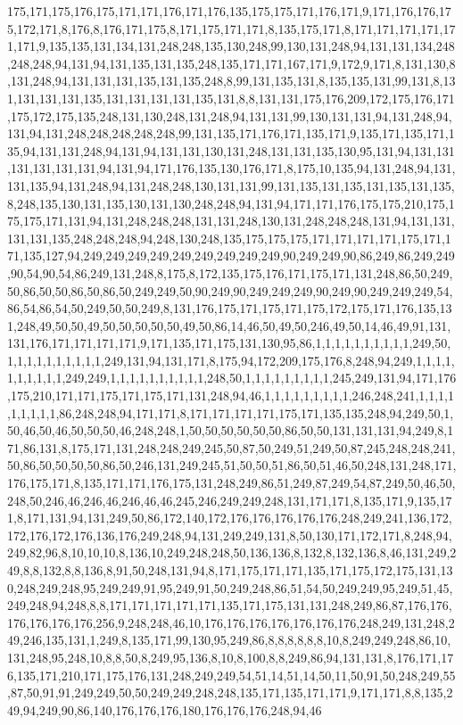 175,171,175,176,175,171,171,176,171,176,135,175,175,171,176,171,9,171,176,176,175,172,171,8,176,8,176,171,175,8,171,175,171,171,8,135,175,171,8,171,171,171,171,171,171,9,135,135,131,134,131,248,248,135,130,248,99,130,131,248,94,131,131,134,248,248,248,94,131,94,131,135,131,135,248,135,171,171,167,171,9,172,9,171,8,131,130,8,131,248,94,131,131,131,135,131,135,248,8,99,131,135,131,8,135,135,131,99,131,8,131,131,131,131,135,131,131,131,131,135,131,8,8,131,131,175,176,209,172,175,176,171,175,172,175,135,248,131,130,248,131,248,94,131,131,99,130,131,131,94,131,248,94,131,94,131,248,248,248,248,248,99,131,135,171,176,171,135,171,9,135,171,135,171,135,94,131,131,248,94,131,94,131,131,130,131,248,131,131,135,130,95,131,94,131,131,131,131,131,131,94,131,94,171,176,135,130,176,171,8,175,10,135,94,131,248,94,131,131,135,94,131,248,94,131,248,248,130,131,131,99,131,135,131,135,131,135,131,135,8,248,135,130,131,135,130,131,130,248,248,94,131,94,171,171,176,175,175,210,175,175,175,171,131,94,131,248,248,248,131,131,248,130,131,248,248,248,131,94,131,131,131,131,135,248,248,248,94,248,130,248,135,175,175,175,171,171,171,171,175,171,171,135,127,94,249,249,249,249,249,249,249,249,249,90,249,249,90,86,249,86,249,249,90,54,90,54,86,249,131,248,8,175,8,172,135,175,176,171,175,171,131,248,86,50,249,50,86,50,50,86,50,86,50,249,249,50,90,249,90,249,249,249,90,249,90,249,249,249,54,86,54,86,54,50,249,50,50,249,8,131,176,175,171,175,171,175,172,175,171,176,135,131,248,49,50,50,49,50,50,50,50,50,49,50,86,14,46,50,49,50,246,49,50,14,46,49,91,131,131,176,171,171,171,171,9,171,135,171,175,131,130,95,86,1,1,1,1,1,1,1,1,1,1,249,50,1,1,1,1,1,1,1,1,1,1,249,131,94,131,171,8,175,94,172,209,175,176,8,248,94,249,1,1,1,1,1,1,1,1,1,1,249,249,1,1,1,1,1,1,1,1,1,1,248,50,1,1,1,1,1,1,1,1,1,245,249,131,94,171,176,175,210,171,171,175,171,175,171,131,248,94,46,1,1,1,1,1,1,1,1,1,246,248,241,1,1,1,1,1,1,1,1,1,86,248,248,94,171,171,8,171,171,171,171,175,171,135,135,248,94,249,50,1,50,46,50,46,50,50,50,46,248,248,1,50,50,50,50,50,50,86,50,50,131,131,131,94,249,8,171,86,131,8,175,171,131,248,248,249,245,50,87,50,249,51,249,50,87,245,248,248,241,50,86,50,50,50,50,86,50,246,131,249,245,51,50,50,51,86,50,51,46,50,248,131,248,171,176,175,171,8,135,171,171,176,175,131,248,249,86,51,249,87,249,54,87,249,50,46,50,248,50,246,46,246,46,246,46,46,245,246,249,249,248,131,171,171,8,135,171,9,135,171,8,171,131,94,131,249,50,86,172,140,172,176,176,176,176,176,248,249,241,136,172,172,176,172,176,136,176,249,248,94,131,249,249,131,8,50,130,171,172,171,8,248,94,249,82,96,8,10,10,10,8,136,10,249,248,248,50,136,136,8,132,8,132,136,8,46,131,249,249,8,8,132,8,8,136,8,91,50,248,131,94,8,171,175,171,171,135,171,175,172,175,131,130,248,249,248,95,249,249,91,95,249,91,50,249,248,86,51,54,50,249,249,95,249,51,45,249,248,94,248,8,8,171,171,171,171,171,135,171,175,131,131,248,249,86,87,176,176,176,176,176,176,256,9,248,248,46,10,176,176,176,176,176,176,176,248,249,131,248,249,246,135,131,1,249,8,135,171,99,130,95,249,86,8,8,8,8,8,8,10,8,249,249,248,86,10,131,248,95,248,10,8,8,50,8,249,95,136,8,10,8,100,8,8,249,86,94,131,131,8,176,171,176,135,171,210,171,175,176,131,248,249,249,54,51,14,51,14,50,11,50,91,50,248,249,55,87,50,91,91,249,249,50,50,249,249,248,248,135,171,135,171,171,9,171,171,8,8,135,249,94,249,90,86,140,176,176,176,180,176,176,176,248,94,46